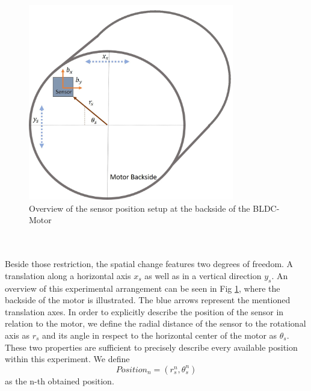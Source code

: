 \documentclass[english]{isasthesis}
\begin{document}
   		\begin{figure}[t]
    	\centering
    		\includegraphics[width=0.8\textwidth]{figures/backside_position_overview_1.jpg}   		
    	\caption{Overview of the sensor position setup at the backside of the BLDC-Motor}
    	\label{fig:backside overview}
    	\end{figure}
\\\\Beside those restriction, the spatial change features two degrees of freedom. A translation along a horizontal axis $x_s$ as well as in a vertical direction $y_s$. An overview of this experimental arrangement can be seen in Fig \ref{fig:backside overview}, where the backside of the motor is illustrated. The blue arrows represent the mentioned translation axes. In order to explicitly describe the position of the sensor in relation to the motor, we define the radial distance of the sensor to the rotational axis as $r_s$ and its angle in respect to the horizontal center of the motor as $\theta_s$. These two properties are sufficient to precisely describe every available position within this experiment. We define
    	\begin{equation}
    		Position_n = (r_s^n, \theta_s^n)
    	\end{equation}
    	as the n-th obtained position.
\end{document}
